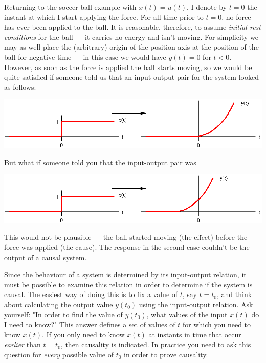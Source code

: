 \documentclass[10pt]{beamer}
\begin{document}
Returning to the soccer ball example with $x(t) = u(t)$, I denote by $t=0$ the instant at which I start applying the force.  For all time prior to $t=0$, no force has ever been applied to the ball.  It is reasonable, therefore, to assume {\em initial rest conditions} for the ball --- it carries no energy and isn't moving.  For simplicity we may as well place the (arbitrary) origin of the position axis at the position of the ball for negative time --- in this case we would have $y(t) = 0$ for $t<0$.  However, as soon as the force is applied the ball starts moving, so we would be quite satisfied if someone told us that an input-output pair for the system looked as follows:
\begin{center}
  \includegraphics{causalballpair}
\end{center}

But what if someone told you that the input-output pair was
\begin{center}
  \includegraphics{causalballpair2}
\end{center}
This would not be plausible --- the ball started moving (the effect) before the force was applied (the cause).  The response in the second case couldn't be the output of a causal system.

Since the behaviour of a system is determined by its input-output relation, it must be possible to examine this relation in order to determine if the system is causal.  The easiest way of doing this is to fix a value of $t$, say $t = t_0$, and think about calculating the output value $y(t_0)$ using the input-output relation.  Ask yourself:  "In order to find the value of $y(t_0)$, what values of the input $x(t)$ do I need to know?"  This answer defines a set of values of $t$ for which you need to know $x(t)$.  If you only need to know $x(t)$ at instants in time that occur {\em earlier} than $t=t_0$, then causality is indicated.  In practice you need to ask this question for {\em every} possible value of $t_0$ in order to prove causality.
\end{document}
